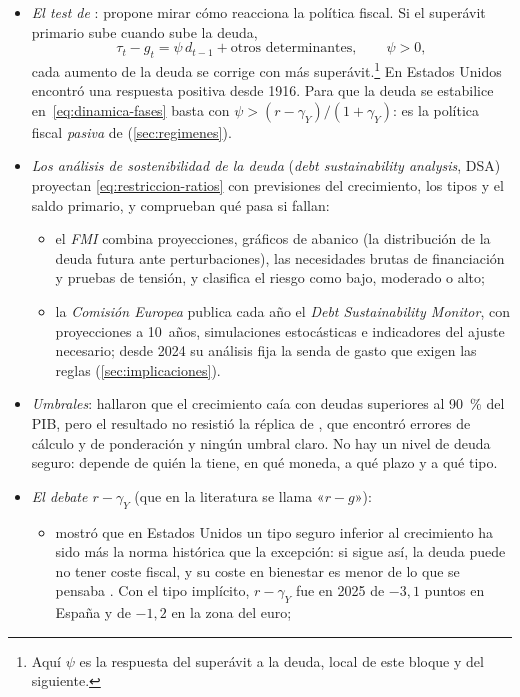 \documentclass[11pt]{article}
\begin{document}
\begin{itemize}
\item \emph{El test de }: \textcite{Bohn1998Behavior} propone mirar cómo reacciona la política fiscal. Si el superávit primario sube cuando sube la deuda,
  \begin{equation*}
  \tau_t-g_t=\psi\,d_{t-1}+\text{otros determinantes},\qquad \psi>0,
  \end{equation*}
  cada aumento de la deuda se corrige con más superávit.\footnote{Aquí $\psi$ es la respuesta del superávit a la deuda, local de este bloque y del siguiente.} En Estados Unidos encontró una respuesta positiva desde 1916. Para que la deuda se estabilice en~\eqref{eq:dinamica-fases} basta con $\psi>(r-\gamma_Y)/(1+\gamma_Y)$: es la política fiscal \emph{pasiva} de  (\ref{sec:regimenes}).
\item \emph{Los análisis de sostenibilidad de la deuda} (\emph{debt sustainability analysis}, DSA) proyectan \eqref{eq:restriccion-ratios} con previsiones del crecimiento, los tipos y el saldo primario, y comprueban qué pasa si fallan:
  \begin{itemize}
  \item el \emph{FMI} combina proyecciones, gráficos de abanico (la distribución de la deuda futura ante perturbaciones), las necesidades brutas de financiación y pruebas de tensión, y clasifica el riesgo como bajo, moderado o alto\nocite{FMI2021DSA};
  \item la \emph{Comisión Europea} publica cada año el \emph{Debt Sustainability Monitor}, con proyecciones a 10~años, simulaciones estocásticas e indicadores del ajuste necesario\nocite{CE2026DSM}; desde 2024 su análisis fija la senda de gasto que exigen las reglas (\ref{sec:implicaciones}).
  \end{itemize}
\item \emph{Umbrales}: \textcite{ReinhartRogoff2010Growth} hallaron que el crecimiento caía con deudas superiores al 90~\% del PIB, pero el resultado no resistió la réplica de \textcite{HerndonAshPollin2014}, que encontró errores de cálculo y de ponderación y ningún umbral claro. No hay un nivel de deuda seguro: depende de quién la tiene, en qué moneda, a qué plazo y a qué tipo.
\item \emph{El debate $r-\gamma_Y$} (que en la literatura se llama «$r-g$»):
  \begin{itemize}
  \item \textcite{Blanchard2019Deuda} mostró que en Estados Unidos un tipo seguro inferior al crecimiento ha sido más la norma histórica que la excepción: si sigue así, la deuda puede no tener coste fiscal, y su coste en bienestar es menor de lo que se pensaba . Con el tipo implícito, $r-\gamma_Y$ fue en 2025 de $-3{,}1$ puntos en España y de $-1{,}2$ en la zona del euro\nocite{Eurostat2026EDP,Eurostat2026nama10gdp};

\end{itemize}
\end{itemize}
\end{document}
